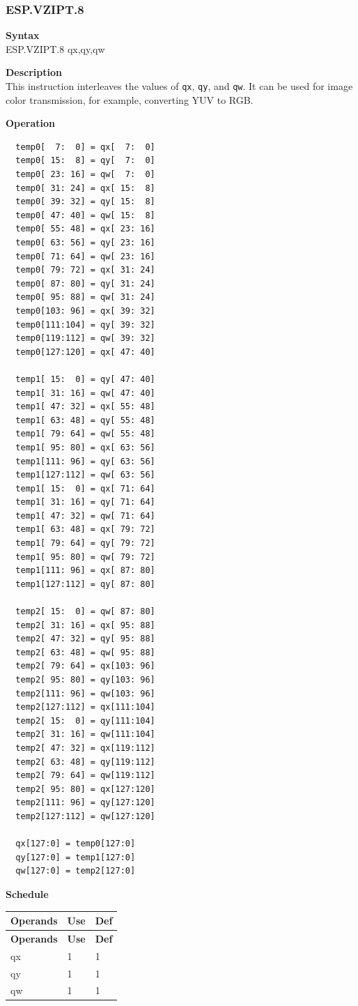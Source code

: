 \newpage
\subsubsection{ESP.VZIPT.8}\label{instruction:ESPVZIPT8}
\textbf{Syntax}\\
ESP.VZIPT.8 qx,qy,qw

\textbf{Description}\\
This instruction interleaves the values of \lstinline{qx}, \lstinline{qy}, and \lstinline{qw}. It can be used for image color transmission, for example, converting YUV to RGB.

\textbf{Operation}\\
\begin{lstlisting}
  temp0[  7:  0] = qx[  7:  0]
  temp0[ 15:  8] = qy[  7:  0]
  temp0[ 23: 16] = qw[  7:  0]
  temp0[ 31: 24] = qx[ 15:  8]
  temp0[ 39: 32] = qy[ 15:  8]
  temp0[ 47: 40] = qw[ 15:  8]
  temp0[ 55: 48] = qx[ 23: 16]
  temp0[ 63: 56] = qy[ 23: 16]
  temp0[ 71: 64] = qw[ 23: 16]
  temp0[ 79: 72] = qx[ 31: 24]
  temp0[ 87: 80] = qy[ 31: 24]
  temp0[ 95: 88] = qw[ 31: 24]
  temp0[103: 96] = qx[ 39: 32]
  temp0[111:104] = qy[ 39: 32]
  temp0[119:112] = qw[ 39: 32]
  temp0[127:120] = qx[ 47: 40]

  temp1[ 15:  0] = qy[ 47: 40]
  temp1[ 31: 16] = qw[ 47: 40]
  temp1[ 47: 32] = qx[ 55: 48]
  temp1[ 63: 48] = qy[ 55: 48]
  temp1[ 79: 64] = qw[ 55: 48]
  temp1[ 95: 80] = qx[ 63: 56]
  temp1[111: 96] = qy[ 63: 56]
  temp1[127:112] = qw[ 63: 56]
  temp1[ 15:  0] = qx[ 71: 64]
  temp1[ 31: 16] = qy[ 71: 64]
  temp1[ 47: 32] = qw[ 71: 64]
  temp1[ 63: 48] = qx[ 79: 72]
  temp1[ 79: 64] = qy[ 79: 72]
  temp1[ 95: 80] = qw[ 79: 72]
  temp1[111: 96] = qx[ 87: 80]
  temp1[127:112] = qy[ 87: 80]

  temp2[ 15:  0] = qw[ 87: 80]
  temp2[ 31: 16] = qx[ 95: 88]
  temp2[ 47: 32] = qy[ 95: 88]
  temp2[ 63: 48] = qw[ 95: 88]
  temp2[ 79: 64] = qx[103: 96]
  temp2[ 95: 80] = qy[103: 96]
  temp2[111: 96] = qw[103: 96]
  temp2[127:112] = qx[111:104]
  temp2[ 15:  0] = qy[111:104]
  temp2[ 31: 16] = qw[111:104]
  temp2[ 47: 32] = qx[119:112]
  temp2[ 63: 48] = qy[119:112]
  temp2[ 79: 64] = qw[119:112]
  temp2[ 95: 80] = qx[127:120]
  temp2[111: 96] = qy[127:120]
  temp2[127:112] = qw[127:120]

  qx[127:0] = temp0[127:0]
  qy[127:0] = temp1[127:0]
  qw[127:0] = temp2[127:0]
\end{lstlisting}

\textbf{Schedule}\\
\begin{longtable}[c]{|l|l|l|}
    \hline
    \rowcolor{lightgray}
    \textbf{Operands} & \textbf{Use} & \textbf{Def} \\\hline
    \endfirsthead
    \hline
    \rowcolor{lightgray}
     \textbf{Operands} & \textbf{Use} & \textbf{Def} \\\hline
    \endhead
    \hline
    \endfoot

  qx & 1 & 1 \\\hline
  qy & 1 & 1 \\\hline
  qw & 1 & 1

\end{longtable}

